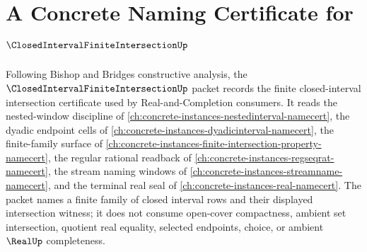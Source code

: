 \chapter{A Concrete Naming Certificate for $\ClosedIntervalFiniteIntersectionUp$}
\label{ch:concrete-instances-closed-interval-finite-intersection-namecert}

Following Bishop and Bridges constructive analysis, the $\ClosedIntervalFiniteIntersectionUp$ packet records the finite closed-interval intersection certificate used by Real-and-Completion consumers. It reads the nested-window discipline of \autoref{ch:concrete-instances-nestedinterval-namecert}, the dyadic endpoint cells of \autoref{ch:concrete-instances-dyadicinterval-namecert}, the finite-family surface of \autoref{ch:concrete-instances-finite-intersection-property-namecert}, the regular rational readback of \autoref{ch:concrete-instances-regseqrat-namecert}, the stream naming windows of \autoref{ch:concrete-instances-streamname-namecert}, and the terminal real seal of \autoref{ch:concrete-instances-real-namecert}. The packet names a finite family of closed interval rows and their displayed intersection witness; it does not consume open-cover compactness, ambient set intersection, quotient real equality, selected endpoints, choice, or ambient $\RealUp$ completeness.

